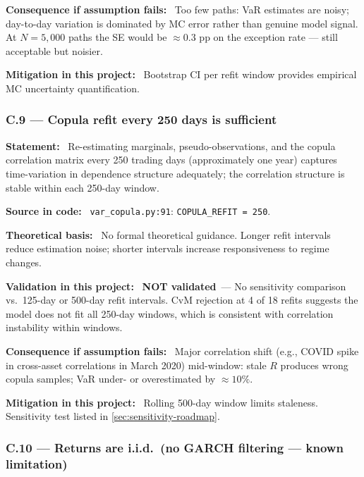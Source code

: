\documentclass[11pt,a4paper]{article}
\newcommand{\asmfield}[1]{\medskip\noindent\textbf{#1:}\ }
\newcommand{\code}[1]{\texttt{#1}}
\newcommand{\notvalidated}{\textbf{NOT validated}}
\begin{document}
\asmfield{Consequence if assumption fails}
Too few paths: VaR estimates are noisy; day-to-day variation is dominated
by MC error rather than genuine model signal. At $N = 5{,}000$ paths the
SE would be $\approx 0.3$ pp on the exception rate --- still acceptable but
noisier.

\asmfield{Mitigation in this project}
Bootstrap CI per refit window provides empirical MC uncertainty quantification.

\subsubsection{C.9 --- Copula refit every 250 days is sufficient}\label{asm:C9}

\asmfield{Statement}
Re-estimating marginals, pseudo-observations, and the copula correlation
matrix every 250 trading days (approximately one year) captures
time-variation in dependence structure adequately; the correlation structure
is stable within each 250-day window.

\asmfield{Source in code}
\code{var\_copula.py:91}: \lstinline|COPULA_REFIT = 250|.

\asmfield{Theoretical basis}
No formal theoretical guidance. Longer refit intervals reduce estimation
noise; shorter intervals increase responsiveness to regime changes.

\asmfield{Validation in this project}
\notvalidated\ --- No sensitivity comparison vs.\ 125-day or 500-day refit
intervals. CvM rejection at 4 of 18 refits suggests the model does not fit
all 250-day windows, which is consistent with correlation instability
within windows.

\asmfield{Consequence if assumption fails}
Major correlation shift (e.g., COVID spike in cross-asset correlations in
March 2020) mid-window: stale $R$ produces wrong copula samples; VaR
under- or overestimated by $\approx 10\%$.

\asmfield{Mitigation in this project}
Rolling 500-day window limits staleness. Sensitivity test listed in
\cref{sec:sensitivity-roadmap}.

\subsubsection{C.10 --- Returns are i.i.d.\ (no GARCH filtering --- known limitation)}\label{asm:C10}
\end{document}
